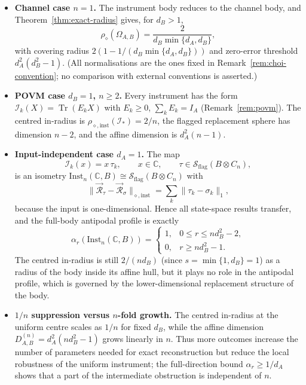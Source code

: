 \documentclass[11pt,a4paper]{article}
\newcommand{\Sstate}{\mathcal{S}}
\newcommand{\Inst}{\mathrm{Inst}}
\newcommand{\Tr}{\operatorname{Tr}}
\begin{document}
\begin{itemize}[leftmargin=*,itemsep=3pt]
\item \textbf{Channel case $n=1$.} The instrument body reduces to the channel body, and Theorem~\ref{thm:exact-radius} gives, for $d_B>1$,
\[
\rho_\diamond(\Omega_{A,B})=\frac{2}{d_B\min\{d_A,d_B\}},
\]
with covering radius $2(1-1/(d_B\min\{d_A,d_B\}))$ and zero-error threshold $d_A^2(d_B^2-1)$. (All normalisations are the ones fixed in Remark~\ref{rem:choi-convention}; no comparison with external conventions is asserted.)

\item \textbf{POVM case $d_B=1$, $n\ge2$.} Every instrument has the form $\mathcal I_k(X)=\Tr(E_kX)$ with $E_k\ge0$, $\sum_kE_k=I_A$ (Remark~\ref{rem:povm}). The centred in-radius is $\rho_{\diamond,\mathrm{inst}}(\mathcal I_*)=2/n$, the flagged replacement sphere has dimension $n-2$, and the affine dimension is $d_A^2(n-1)$.

\item \textbf{Input-independent case $d_A=1$.} The map
\[
\mathcal I_k(x)=x\,\tau_k,\qquad x\in\mathbb C,\qquad \tau\in\Sstate_{\mathrm{flag}}(B\otimes C_n),
\]
is an isometry $\Inst_n(\mathbb C,B)\cong\Sstate_{\mathrm{flag}}(B\otimes C_n)$ with
\[
\|\vec{\mathcal R}_\tau-\vec{\mathcal R}_\sigma\|_{\diamond,\mathrm{inst}}
=\sum_k\|\tau_k-\sigma_k\|_1,
\]
because the input is one-dimensional. Hence all state-space results transfer, and the full-body antipodal profile is exactly
\[
\alpha_r(\Inst_n(\mathbb C,B))=
\begin{cases}
1,&0\le r\le nd_B^2-2,\\
0,&r\ge nd_B^2-1.
\end{cases}
\]
The centred in-radius is still $2/(nd_B)$ (since $s=\min\{1,d_B\}=1$) as a radius of the body inside its affine hull, but it plays no role in the antipodal profile, which is governed by the lower-dimensional replacement structure of the body.

\item \textbf{$1/n$ suppression versus $n$-fold growth.} The centred in-radius at the uniform centre scales as $1/n$ for fixed $d_B$, while the affine dimension $D_{A,B}^{(n)}=d_A^2(nd_B^2-1)$ grows linearly in $n$. Thus more outcomes increase the number of parameters needed for exact reconstruction but reduce the local robustness of the uniform instrument; the full-direction bound $\alpha_r\ge1/d_A$ shows that a part of the intermediate obstruction is independent of $n$.
\end{itemize}
\end{document}
